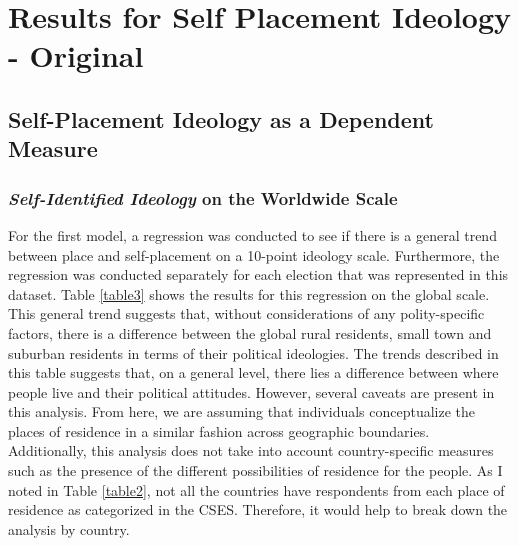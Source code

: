 \documentclass[12pt, titlepage]{article}
\title{\tb{Place of Residence and Political Attitudes in Democracies Worldwide \\ {\large Online Appendix A -- Original Results} }}
\author{Jennifer Lin}
\affil{New College of Florida}
\newcommand\e{\emph}
\begin{document}
\begin{singlespace}
\maketitle
\end{singlespace}

\section{Results for Self Placement Ideology - Original}

\subsection{Self-Placement Ideology as a Dependent Measure}

\subsubsection{\e{Self-Identified Ideology} on the Worldwide Scale}

For the first model, a regression was conducted to see if there is a general trend between place and self-placement on a 10-point ideology scale. Furthermore, the regression was conducted separately for each election that was represented in this dataset. Table \ref{table3} shows the results for this regression on the global scale. This general trend suggests that, without considerations of any polity-specific factors, there is a difference between the global rural residents, small town and suburban residents in terms of their political ideologies. The trends described in this table suggests that, on a general level, there lies a difference between where people live and their political attitudes. However, several caveats are present in this analysis. From here, we are assuming that individuals conceptualize the places of residence in a similar fashion across geographic boundaries. Additionally, this analysis does not take into account country-specific measures such as the presence of the different possibilities of residence for the people. As I noted in Table \ref{table2}, not all the countries have respondents from each place of residence as categorized in the CSES. Therefore, it would help to break down the analysis by country.
\end{document}
